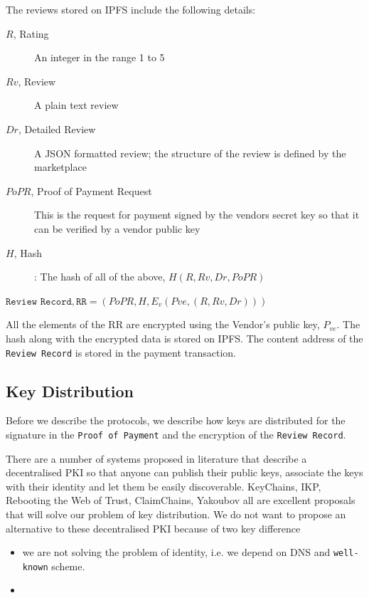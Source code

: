 \documentclass[a4paper]{article}
\begin{document}
The reviews stored on IPFS include the following details: 

\begin{description}
\item[$R$, Rating] An integer in the range 1 to 5
\item[$Rv$, Review] A plain text review
\item[$Dr$, Detailed Review] A JSON formatted review; the structure of
  the review is defined by the marketplace
\item[$PoPR$, Proof of Payment Request] This is the request for
  payment signed by the vendors secret key so that it can be verified
  by a vendor public key
\item[$H$, Hash]: The hash of all of the above, $H(R, Rv, Dr, PoPR)$
\end{description}

$\texttt{Review Record}, \texttt{RR} = (PoPR, H, E_v(Pve, (R, Rv, Dr)))$

All the elements of the RR are encrypted using the Vendor's public key,
$P_{ve}$.  The hash along with the encrypted data is stored on IPFS\@. The
content address of the \texttt{Review Record} is stored in the payment
transaction.

\subsection{Key Distribution}\label{sec:key-distribution}

Before we describe the protocols, we describe how keys are distributed
for the signature in the \texttt{Proof of Payment} and the encryption
of the \texttt{Review Record}.

There are a number of systems proposed in literature that describe a
decentralised PKI so that anyone can publish their public keys,
associate the keys with their identity and let them be easily
discoverable. KeyChains, IKP, Rebooting the Web of Trust, ClaimChains,
Yakoubov all are excellent proposals that will solve our problem of
key distribution. We do not want to propose an alternative to these
decentralised PKI because of two key difference

\begin{itemize}
\item we are not solving the problem of identity, i.e\@. we depend on
  DNS and \texttt{well-known}\cite{wellknown} scheme.
\item 
\end{itemize}
\end{document}
